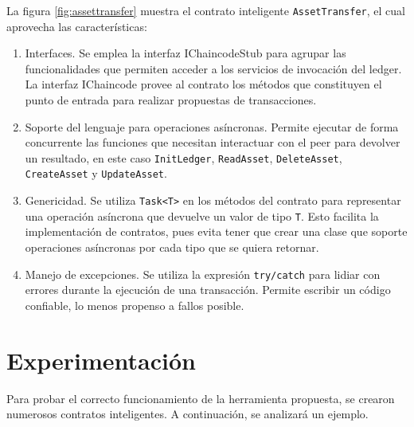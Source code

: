 La figura \ref{fig:assettransfer} muestra el contrato inteligente \texttt{AssetTransfer}, el cual aprovecha las características:

\begin{enumerate}

\item Interfaces. Se emplea la interfaz IChaincodeStub para agrupar las funcionalidades que permiten acceder a los servicios de invocación del ledger. La interfaz IChaincode provee al contrato los métodos que constituyen el punto de entrada para realizar propuestas de transacciones.

\item Soporte del lenguaje para operaciones asíncronas. Permite ejecutar de forma concurrente las funciones que necesitan interactuar con el peer para devolver un resultado, en este caso \texttt{InitLedger}, \texttt{ReadAsset}, \texttt{DeleteAsset}, \texttt{CreateAsset} y \texttt{UpdateAsset}. 

\item Genericidad. Se utiliza \texttt{Task<T>} en los métodos del contrato para representar una operación asíncrona que devuelve un valor de tipo \texttt{T}. Esto facilita la implementación de contratos, pues evita tener que crear una clase que soporte operaciones asíncronas por cada tipo que se quiera retornar.



\item Manejo de excepciones. Se utiliza la expresión \texttt{try/catch} para lidiar con errores durante la ejecución de una transacción. Permite escribir un código confiable, lo menos propenso a fallos posible.
\end{enumerate}

\section{Experimentación}

Para probar el correcto funcionamiento de la herramienta propuesta, se crearon numerosos contratos inteligentes. A continuación, se analizará un ejemplo.

